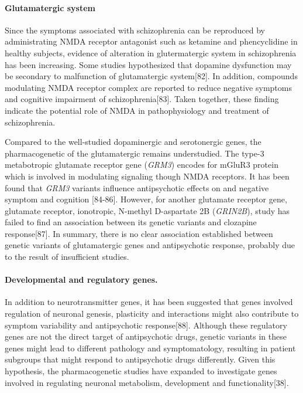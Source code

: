 \documentclass[12pt]{report}
\newcommand{\gene}[1]{\textit{#1}}
\begin{document}
			\paragraph{Glutamatergic system}
				Since the symptoms associated with schizophrenia can be reproduced by administrating NMDA receptor antagonist such as ketamine and phencyclidine in healthy subjects, evidence of alteration in glutermatergic system in schizophrenia has been increasing. 
				Some studies hypothesized that dopamine dysfunction may be secondary to malfunction of glutamatergic system[82].  
				In addition, compounds modulating NMDA receptor complex are reported to reduce negative symptoms and cognitive impairment of schizophrenia[83]. 
				Taken together, these finding indicate the potential role of NMDA in pathophysiology and treatment of schizophrenia. 
				
				Compared to the well-studied dopaminergic and serotonergic genes, the pharmacogenetic of the glutamatergic remains understudied. 
				The type-3 metabotropic glutamate receptor gene (\gene{GRM3}) encodes for mGluR3 protein which is involved in modulating signaling though NMDA receptors. 
				It has been found that \gene{GRM3} variants influence antipsychotic effects on and negative symptom and cognition [84-86]. 
				However, for another glutamate receptor gene, glutamate receptor, ionotropic, N-methyl D-aspartate 2B (\gene{GRIN2B}), study has failed to find an association between its genetic variants and clozapine response[87]. 
				In summary, there is no clear association established between genetic variants of glutamatergic genes and antipsychotic response, probably due to the result of insufficient studies. 
				
			\paragraph{Developmental and regulatory genes.} 
				In addition to neurotransmitter genes, it has been suggested that genes involved regulation of neuronal genesis, plasticity and interactions might also contribute to symptom variability and antipsychotic response[88].
				Although these regulatory genes are not the direct target of antipsychotic drugs, genetic variants in these genes might lead to different pathology and symptomatology, resulting in patient subgroups that might respond to antipsychotic drugs differently. 
				Given this hypothesis, the pharmacogenetic studies have expanded to investigate genes involved in regulating neuronal metabolism, development and functionality[38]. 
				
\end{document}
